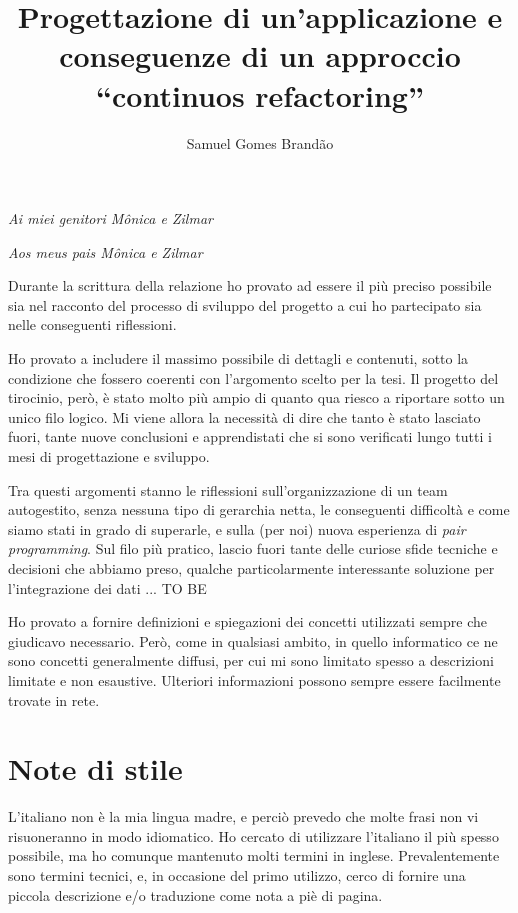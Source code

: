 \documentclass[12pt]{report}
\begin{document}
\title{Progettazione di un'applicazione e conseguenze di un approccio ``continuos refactoring''}
\author{Samuel Gomes Brandão}

\beforepreface
{}
        {\hfill \Large {\sl Ai miei genitori Mônica e Zilmar}}

        {\hfill \Large {\sl Aos meus pais Mônica e Zilmar}}
% 
%

Durante la scrittura della relazione ho provato ad essere il più preciso possibile sia nel racconto del processo di sviluppo del progetto a cui ho partecipato sia nelle conseguenti riflessioni.

Ho provato a includere il massimo possibile di dettagli e contenuti, sotto la condizione che fossero coerenti con l'argomento scelto per la tesi. Il progetto del tirocinio, però, è stato molto più ampio di quanto qua riesco a riportare sotto un unico filo logico. Mi viene allora la necessità di dire che tanto è stato lasciato fuori, tante nuove conclusioni e apprendistati che si sono verificati lungo tutti i mesi di progettazione e sviluppo.

Tra questi argomenti stanno le riflessioni sull'organizzazione di un team autogestito, senza nessuna tipo di gerarchia netta, le conseguenti difficoltà e come siamo stati in grado di superarle, e sulla (per noi) nuova esperienza di \textit{pair programming}. Sul filo più pratico, lascio fuori tante delle curiose sfide tecniche e decisioni che abbiamo preso, qualche particolarmente interessante soluzione per l'integrazione dei dati ... TO BE 

Ho provato a fornire definizioni e spiegazioni dei concetti utilizzati sempre
che giudicavo necessario. Però, come in qualsiasi ambito, in quello informatico 
ce ne sono concetti generalmente diffusi, per cui mi sono limitato spesso a
descrizioni limitate e non esaustive. Ulteriori informazioni possono sempre
essere facilmente trovate in rete.

\section*{Note di stile}
L'italiano non è la mia lingua madre, e perciò prevedo che molte frasi
non vi risuoneranno in modo idiomatico. Ho cercato di utilizzare l'italiano
il più spesso possibile, ma ho comunque mantenuto molti termini in inglese.
Prevalentemente sono termini tecnici, e, in occasione del primo utilizzo,
cerco di fornire una piccola descrizione e/o traduzione come nota a piè di
pagina.
\end{document}
